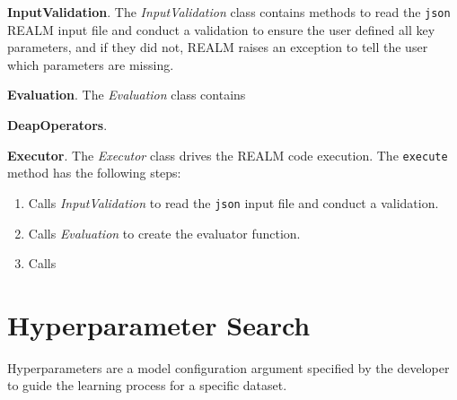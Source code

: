 \vspace{0.2cm} 
\noindent
\textbf{InputValidation}. The \textit{InputValidation} class contains methods 
to read the \texttt{json} \gls{REALM} input file and conduct a validation to 
ensure the user defined all key parameters, and if they did not, \gls{REALM} 
raises an exception to tell the user which parameters are missing. 

\vspace{0.2cm} 
\noindent
\textbf{Evaluation}. The \textit{Evaluation} class contains 

\vspace{0.2cm} 
\noindent
\textbf{DeapOperators}. 

\vspace{0.2cm} 
\noindent
\textbf{Executor}. The \textit{Executor} class drives the \gls{REALM} code
execution. 
The \texttt{execute} method has the following steps: 
\begin{enumerate}
    \item Calls \textit{InputValidation} to read the \texttt{json} input file 
    and conduct a validation.
    \item Calls \textit{Evaluation} to create the evaluator function. 
    \item Calls \textit{}
\end{enumerate}

\section{Hyperparameter Search}
Hyperparameters are a model configuration argument specified by the developer to 
guide the learning process for a specific dataset. 